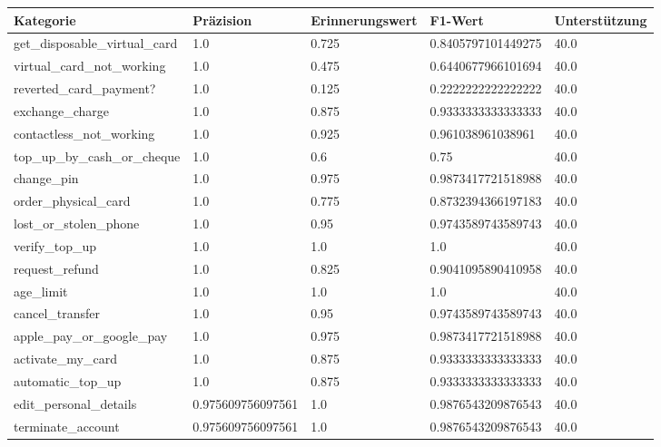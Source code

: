 
    \begin{table}[!ht]
        \centering
        \begin{tabularx}{\textwidth}{X l l l l}
\toprule
\textbf{Kategorie} & \textbf{Präzision} & \textbf{Erinnerungswert} & \textbf{F1-Wert} & \textbf{Unterstützung} \\
\midrule
get\_disposable\_virtual\_card & \num{1.0} & \num{0.725} & \num{0.8405797101449275} & \num{40.0} \\
virtual\_card\_not\_working & \num{1.0} & \num{0.475} & \num{0.6440677966101694} & \num{40.0} \\
reverted\_card\_payment? & \num{1.0} & \num{0.125} & \num{0.2222222222222222} & \num{40.0} \\
exchange\_charge & \num{1.0} & \num{0.875} & \num{0.9333333333333333} & \num{40.0} \\
contactless\_not\_working & \num{1.0} & \num{0.925} & \num{0.961038961038961} & \num{40.0} \\
top\_up\_by\_cash\_or\_cheque & \num{1.0} & \num{0.6} & \num{0.75} & \num{40.0} \\
change\_pin & \num{1.0} & \num{0.975} & \num{0.9873417721518988} & \num{40.0} \\
order\_physical\_card & \num{1.0} & \num{0.775} & \num{0.8732394366197183} & \num{40.0} \\
lost\_or\_stolen\_phone & \num{1.0} & \num{0.95} & \num{0.9743589743589743} & \num{40.0} \\
verify\_top\_up & \num{1.0} & \num{1.0} & \num{1.0} & \num{40.0} \\
request\_refund & \num{1.0} & \num{0.825} & \num{0.9041095890410958} & \num{40.0} \\
age\_limit & \num{1.0} & \num{1.0} & \num{1.0} & \num{40.0} \\
cancel\_transfer & \num{1.0} & \num{0.95} & \num{0.9743589743589743} & \num{40.0} \\
apple\_pay\_or\_google\_pay & \num{1.0} & \num{0.975} & \num{0.9873417721518988} & \num{40.0} \\
activate\_my\_card & \num{1.0} & \num{0.875} & \num{0.9333333333333333} & \num{40.0} \\
automatic\_top\_up & \num{1.0} & \num{0.875} & \num{0.9333333333333333} & \num{40.0} \\
edit\_personal\_details & \num{0.975609756097561} & \num{1.0} & \num{0.9876543209876543} & \num{40.0} \\
terminate\_account & \num{0.975609756097561} & \num{1.0} & \num{0.9876543209876543} & \num{40.0} \\

\end{tabularx}
\end{table}
